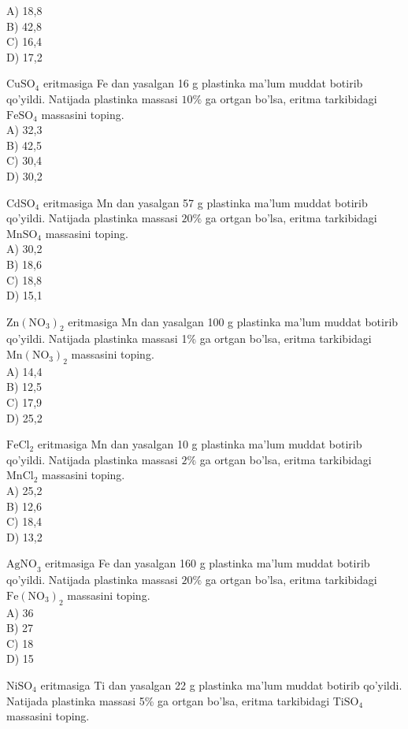 A) 18,8\\
B) 42,8\\
C) 16,4\\
D) 17,2
  \item $\mathrm{CuSO}_{4}$ eritmasiga Fe dan yasalgan 16 g plastinka ma'lum muddat botirib qo'yildi. Natijada plastinka massasi $10 \%$ ga ortgan bo'lsa, eritma tarkibidagi $\mathrm{FeSO}_{4}$ massasini toping.\\
A) 32,3\\
B) 42,5\\
C) 30,4\\
D) 30,2
  \item $\mathrm{CdSO}_{4}$ eritmasiga Mn dan yasalgan 57 g plastinka ma'lum muddat botirib qo'yildi. Natijada plastinka massasi $20 \%$ ga ortgan bo'lsa, eritma tarkibidagi $\mathrm{MnSO}_{4}$ massasini toping.\\
A) 30,2\\
B) 18,6\\
C) 18,8\\
D) 15,1
  \item $\mathrm{Zn}\left(\mathrm{NO}_{3}\right)_{2}$ eritmasiga Mn dan yasalgan 100 g plastinka ma'lum muddat botirib\\
qo'yildi. Natijada plastinka massasi 1\% ga ortgan bo'lsa, eritma tarkibidagi $\mathrm{Mn}\left(\mathrm{NO}_{3}\right)_{2}$ massasini toping.\\
A) 14,4\\
B) 12,5\\
C) 17,9\\
D) 25,2
  \item $\mathrm{FeCl}_{2}$ eritmasiga Mn dan yasalgan 10 g plastinka ma'lum muddat botirib qo'yildi. Natijada plastinka massasi $2 \%$ ga ortgan bo'lsa, eritma tarkibidagi $\mathrm{MnCl}_{2}$ massasini toping.\\
A) 25,2\\
B) 12,6\\
C) 18,4\\
D) 13,2
  \item $\mathrm{AgNO}_{3}$ eritmasiga Fe dan yasalgan 160 g plastinka ma'lum muddat botirib qo'yildi. Natijada plastinka massasi $20 \%$ ga ortgan bo'lsa, eritma tarkibidagi $\mathrm{Fe}\left(\mathrm{NO}_{3}\right)_{2}$ massasini toping.\\
A) 36\\
B) 27\\
C) 18\\
D) 15
  \item $\mathrm{NiSO}_{4}$ eritmasiga Ti dan yasalgan 22 g plastinka ma'lum muddat botirib qo'yildi. Natijada plastinka massasi 5\% ga ortgan bo'lsa, eritma tarkibidagi $\mathrm{TiSO}_{4}$ massasini toping.\\
